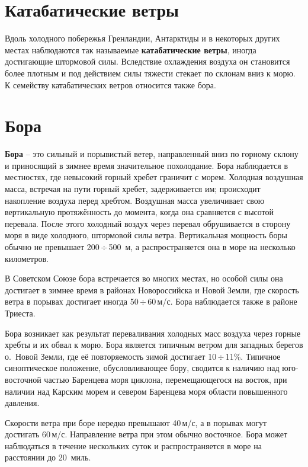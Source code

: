\documentclass[a4paper, 12pt, twoside, final, book, russian, fittopage, cyremdash, openright]{ncc}
\newcommand{\mps}{\,м/с\xspace}
\newcommand{\otdo}{\,\ensuremath{\div}\,}
\begin{document}
\section{Катабатические ветры}
\label{sec:catabatic_wind}

Вдоль холодного побережья Гренландии, Антарктиды и в некоторых других
местах наблюдаются так называемые \textbf{катабатические
  ветры}, иногда достигающие штормовой
силы. Вследствие охлаждения воздуха он становится более плотным и под
действием силы тяжести стекает по склонам вниз к морю. К семейству
катабатических ветров относится также бора.

\section{Бора}
\label{sec:bora_wind}

\textbf{Бора} \--- это сильный и порывистый ветер, направленный вниз
по горному склону и приносящий в зимнее время значительное
похолодание. Бора наблюдается в местностях, где невысокий горный
хребет граничит с морем. Холодная воздушная масса, встречая на пути
горный хребет, задерживается им; происходит накопление воздуха перед
хребтом. Воздушная масса увеличивает свою вертикальную протяжённость
до момента, когда она сравняется с высотой перевала. После этого
холодный воздух через перевал обрушивается в сторону моря в виде
холодного, штормовой силы ветра. Вертикальная мощность боры обычно не
превышает 200\otdo{}500~м, а распространяется она в море на несколько
километров.

В Советском Союзе бора встречается во многих местах, но особой силы
она достигает в зимнее время в районах Новороссийска и Новой Земли,
где скорость ветра в порывах достигает иногда 50\otdo{}60\mps. Бора
наблюдается также в районе Триеста.

Бора возникает как результат переваливания холодных масс воздуха через
горные хребты и их обвал к морю. Бора является типичным ветром для
западных берегов о.~Новой Земли, где её повторяемость зимой достигает
10\otdo{}11\%. Типичное синоптическое положение, обусловливающее бору,
сводится к наличию над юго-восточной частью Баренцева моря циклона,
перемещающегося на восток, при наличии над Карским морем и севером
Баренцева моря области повышенного давления.

Скорости ветра при боре нередко превышают 40\mps{}, а в порывах могут
достигать 60\mps{}.  Направление ветра при этом обычно восточное. Бора
может наблюдаться в течение нескольких суток и распространяется в море
на расстоянии до 20~миль.
\end{document}
